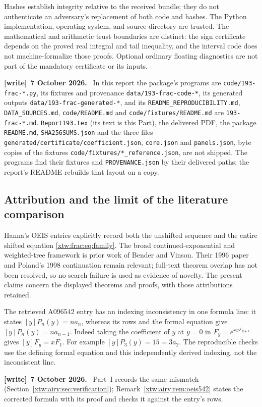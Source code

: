 \documentclass[11pt]{article}
\theoremstyle{remark}\newtheorem{remark}[theorem]{Remark}
\newcommand{\file}[1]{\nolinkurl{#1}}
\newenvironment{writenote}[1][]{\par\smallskip\begingroup\small
 \noindent\textbf{[write]}\if\relax\detokenize{#1}\relax\else~\textbf{#1.}\fi\ }%
 {\par\endgroup\smallskip}
\begin{document}
Hashes establish integrity relative to the received bundle; they do not
authenticate an adversary's replacement of both code and hashes. The
Python implementation, operating system, and source directory are trusted.
The mathematical and arithmetic trust boundaries are distinct: the sign
certificate depends on the proved real integral and tail inequality, and
the interval code does not machine-formalize those proofs. Optional ordinary
floating diagnostics are not part of the mandatory certificate or its inputs.
\begin{writenote}[7 October 2026]
In this report the package's programs are \file{code/193-frac-*.py}, its fixtures and provenance \file{data/193-frac-code-*}, its generated outputs \file{data/193-frac-generated-*}, and its \file{README_REPRODUCIBILITY.md}, \file{DATA_SOURCES.md}, \file{code/README.md} and \file{code/fixtures/README.md} are \file{193-frac-*.md}. \file{Report193.tex} (its text is this Part), the delivered PDF, the package \file{README.md}, \file{SHA256SUMS.json} and the three files \file{generated/certificate/coefficient.json}, \file{core.json} and \file{panels.json}, byte copies of the fixtures \file{code/fixtures/*_reference.json}, are not shipped. The programs find their fixtures and \file{PROVENANCE.json} by their delivered paths; the report's README rebuilds that layout on a copy.
\end{writenote}

\subsection{Attribution and the limit of the literature comparison}
Hanna's OEIS entries explicitly record both the unshifted sequence and the
entire shifted equation \eqref{xtw:frac:eq:family}. The broad continued-exponential
and weighted-tree framework is prior work of Bender and Vinson.
Their 1996 paper and Poland's 1998 continuation remain relevant; full-text
theorem overlap has not been resolved, so no search failure is used as
evidence of novelty. The present claims concern the displayed theorems and
proofs, with those attributions retained.

The retrieved A096542 entry has an indexing inconsistency in one formula
line: it states $[y]P_n(y)=na_n$, whereas its rows and the formal equation
give $[y]P_n(y)=na_{n-1}$. Indeed taking the coefficient of $y$ at $y=0$
in $F_y=e^{xyF_{y+1}}$ gives $[y]F_y=xF_1$.
For example $[y]P_3(y)=15=3a_2$. The reproducible checks use the defining
formal equation and this independently derived indexing, not the
inconsistent line.
\begin{writenote}[7 October 2026]
Part~I records the same mismatch (Section~\ref{xtw:airy:sec:verification}); Remark~\ref{xtw:airy:rem:oeis542} states the corrected formula with its proof and checks it against the entry's rows.
\end{writenote}
\end{document}
